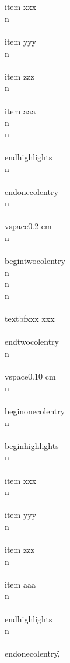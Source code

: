 {          \\\\item xxx\\n                \\\\item yyy\\n                \\\\item zzz\\n                \\\\item aaa\\n                \\n            \\\\end{highlights}\\n        \\\\end{onecolentry}\\n        \\\\vspace{0.2 cm}\\n        \\\\begin{twocolentry}{\\n            \\n        }\\n            \\\\textbf{xxx xxx}\\\\end{twocolentry}\\n        \\\\vspace{0.10 cm}\\n        \\\\begin{onecolentry}\\n            \\\\begin{highlights}\\n                \\\\item xxx\\n                \\\\item yyy\\n                \\\\item zzz\\n                \\\\item aaa\\n            \\\\end{highlights}\\n        \\\\end{onecolentry}\",
  
}

